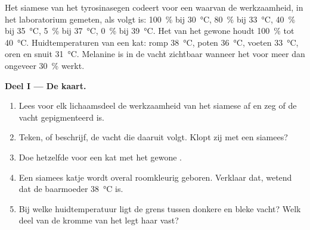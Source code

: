 \begin{problem}
\label{pb:g11:enzymes-and-phenotype:1}
Het siamese  van het tyrosinasegen codeert voor een  waarvan de
werkzaamheid, in het laboratorium gemeten, als volgt is:
\qty{100}{\percent} bij \qty{30}{\celsius}, \qty{80}{\percent} bij
\qty{33}{\celsius}, \qty{40}{\percent} bij \qty{35}{\celsius},
\qty{5}{\percent} bij \qty{37}{\celsius}, \qty{0}{\percent} bij
\qty{39}{\celsius}. Het  van het gewone  houdt
\qty{100}{\percent} tot \qty{40}{\celsius}. Huidtemperaturen van een kat:
romp \qty{38}{\celsius}, poten \qty{36}{\celsius}, voeten
\qty{33}{\celsius}, oren en snuit \qty{31}{\celsius}. Melanine is in de
vacht zichtbaar wanneer het  voor meer dan ongeveer
\qty{30}{\percent} werkt.

\medskip
\noindent\textbf{Deel I --- De kaart.}
\begin{enumerate}
  \item Lees voor elk lichaamsdeel de werkzaamheid van het siamese 
        af en zeg of de vacht gepigmenteerd is.
  \item Teken, of beschrijf, de vacht die daaruit volgt. Klopt zij met een
        siamees?
  \item Doe hetzelfde voor een kat met het gewone .
  \item Een siamees katje wordt overal roomkleurig geboren. Verklaar dat,
        wetend dat de baarmoeder \qty{38}{\celsius} is.
  \item Bij welke huidtemperatuur ligt de grens tussen donkere en bleke
        vacht? Welk deel van de kromme van het  legt haar vast?
\end{enumerate}


\end{problem}
